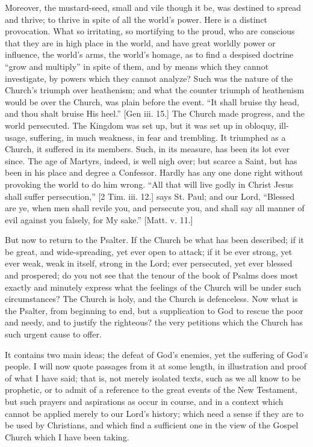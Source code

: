 Moreover, the mustard-seed, small and vile though it be, was
destined to spread and thrive; to thrive in spite of all the world's
power. Here is a distinct provocation. What so irritating, so
mortifying to the proud, who are conscious that they are in high place
in the world, and have great worldly power or influence, the world's
arms, the world's homage, as to find a despised doctrine ``grow
and multiply'' in spite of them, and by means which they cannot
investigate, by powers which they cannot analyze? Such was the nature
of the Church's triumph over heathenism; and what the counter triumph
of heathenism would be over the Church, was plain before the event.
``It shall bruise thy head, and thou shalt bruise His heel.''
[Gen iii. 15.] The Church made progress, and the world persecuted. The
Kingdom was set up, but it was set up in obloquy, ill-usage,
suffering, in much weakness, in fear and trembling. It triumphed as a
Church, it suffered in its members. Such, in its measure, has been its
lot ever since. The age of Martyrs, indeed, is well nigh over; but
scarce a Saint, but has been in his place and degree a Confessor.
Hardly has any one done right without provoking the world to do him
wrong. ``All that will live godly in Christ Jesus shall suffer
persecution,'' [2 Tim. iii. 12.] says St. Paul; and our Lord,
``Blessed are ye, when men shall revile you, and persecute you,
and shall say all manner of evil against you falsely, for My
sake.'' [Matt. v. 11.]

But now to return to the Psalter. If the Church be what has been
described; if it be great, and wide-spreading, yet ever open to
attack; if it be ever strong, yet ever weak, weak in itself, strong in
the Lord; ever persecuted, yet ever blessed and prospered; do you not
see that the tenour of the book of Psalms does most exactly and
minutely express what the feelings of the Church will be under such
circumstances? The Church is holy, and the Church is defenceless. Now
what is the Psalter, from beginning to end, but a supplication to God
to rescue the poor and needy, and to justify the righteous? the very
petitions which the Church has such urgent cause to offer.

It contains two main ideas; the defeat of God's enemies, yet the
suffering of God's people. I will now quote passages from it at some
length, in illustration and proof of what I have said; that is, not
merely isolated texts, such as we all know to be prophetic, or to
admit of a reference to the great events of the New Testament, but
such prayers and aspirations as occur in course, and in a context
which cannot be applied merely to our Lord's history; which need a
sense if they are to be used by Christians, and which find a
sufficient one in the view of the Gospel Church which I have been
taking.

